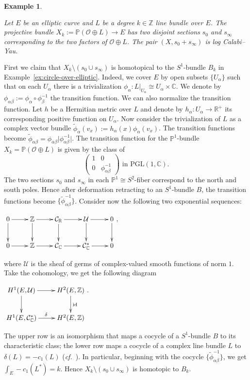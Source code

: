 \documentclass{amsart}
\theoremstyle{definition}
\newtheorem{example}[theorem]{Example}
\theoremstyle{remark}
\numberwithin{equation}{section}
\begin{document}
\begin{example}\label{ex:p1-over-elliptic}
{\em Let $E$ be an elliptic curve and $L$ be a degree $k\in \mathbb{Z}$ line bundle over $E$. The projective bundle $X_k:=\mathbb{P}(\mathcal{O}\oplus L)\rightarrow E$ has two disjoint sections $s_0$ and $s_{\infty}$ corresponding to the two factors of $\mathcal{O}\oplus L$. The pair $(X,s_0+s_\infty)$ is log Calabi--Yau.

First we claim that $X_k\setminus (s_0\cup s_\infty)$ is homotopical to the $S^1$-bundle $B_k$ in Example~\ref{ex:circle-over-elliptic}. Indeed, we cover $E$ by open subsets $\{U_\alpha\}$ such that on each $U_{\alpha}$ there is a trivialization $\phi_{\alpha}:L|_{U_{\alpha}}\cong U_\alpha\times \mathbb{C}$. We denote by $\phi_{\alpha\beta}:=\phi_{\alpha}\circ \phi_{\beta}^{-1}$ the transition function. We can also normalize the transition function. Let $h$ be a Hermitian metric over $L$ and denote by $h_\alpha:U_\alpha\rightarrow \mathbb{R}^+$ its corresponding positive function on $U_\alpha$. Now consider the trivialization of $L$ as a complex vector bundle $\tilde{\phi}_\alpha(v_x):=h_\alpha(x)\phi_\alpha(v_x)$. The transition functions become $\tilde{\phi}_{\alpha\beta}=\phi_{\alpha\beta}{\vert\phi_{\alpha\beta}^{-1}\vert}$. The transition function for the $\mathbb{P}^1$-bundle $X_k=\mathbb{P}(\mathcal{O}\oplus L)$
is given by the class of 
\[
\begin{pmatrix}
1 & 0 \\
0 & \phi_{\alpha\beta}^{-1}
\end{pmatrix}
\text{ in } \mathrm{PGL}(1,\mathbb{C}).
\]
The two sections $s_0$ and $s_\infty$ in each $\mathbb{P}^1\cong S^2$-fiber correspond to the north and south poles. Hence after deformation retracting to an $S^1$-bundle $B$, the transition functions become $\{\tilde{\phi}_{\alpha\beta}^{-1}\}$.
Consider now the following two exponential sequences:
\begin{center}
    $\xymatrix{
0\ar[r]\ar[d] & \mathbb{Z} \ar[r]\ar[d]&\mathcal{C}_{\mathbb{R}}\ar[d]\ar[r] & \mathcal{U}\ar[r]\ar[d] & 0 \ar[d]\\
0\ar[r] & \mathbb{Z} \ar[r] & \mathcal{C}_{\mathbb{C}}\ar[r] &\mathcal{C}_{\mathbb{C}}^{\ast}\ar[r] & 0}$,
\end{center}
where $\mathcal{U}$ is the sheaf of germs of complex-valued smooth functions of norm $1$. Take the cohomology, we get the following diagram
\begin{center}
    $\xymatrix{H^1(E,\mathcal{U})\ar[r]\ar[d] & H^2(E,\mathbb{Z}) \ar[d]^{{\rm id}}\\
    H^1(E,\mathcal{C}_{\mathbb{C}}^{\ast})\ar[r]^\delta & H^2(E,\mathbb{Z})}$.
\end{center}
The upper row is an isomorphism that maps a cocycle of a $S^1$-bundle $B$ to its characteristic class; the lower row maps a cocycle of a complex line bundle $L$ to $\delta(L)=-c_1(L)$ (\emph{cf.}~\cite[Proposition~4.4.12]{Huy05}). In particular, beginning with the cocycle $\{\tilde{\phi}_{\alpha\beta}^{-1}\}$, we get $\int_E-c_1(L^\ast)=k$. Hence $X_k\setminus (s_0\cup s_\infty)$ is homotopic to $B_k$.

}
\end{example}
\end{document}
